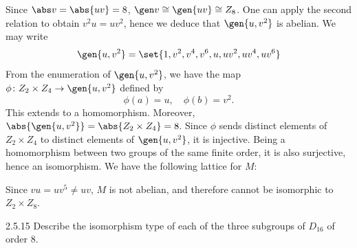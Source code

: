 \begin{sol}
    Since $\abs v = \abs{uv} = 8$, $\gen v \cong \gen{uv} \cong Z_8$.
	One can apply the second relation to obtain $v^2u = uv^2$, hence we deduce that $\gen{u, v^2}$ is abelian.
	We may write
    \[
    	\gen{u, v^2} = \set{1, v^2, v^4, v^6, u, uv^2, uv^4, uv^6}
    \]
    From the enumeration of $\gen{u, v^2}$, we have the map $\phi \colon Z_2 \times Z_4 \to \gen{u, v^2}$ defined by
    \[
    	\phi(a) = u, \quad \phi(b) = v^2.
    \]
    This extends to a homomorphism.
	Moreover, $\abs{\gen{u, v^2}} = \abs{Z_2 \times Z_4} = 8$.
	Since $\phi$ sends distinct elements of $Z_2 \times Z_4$ to distinct elements of $\gen{u, v^2}$, it is injective.
	Being a homomorphism between two groups of the same finite order, it is also surjective, hence an isomorphism.
	We have the following lattice for $M$:
    \begin{center}
    \end{center}
    Since $vu = uv^5 \neq uv$, $M$ is not abelian, and therefore cannot be isomorphic to $Z_2 \times Z_8$.
\end{sol}

\begin{exercise}{2.5.15}
    Describe the isomorphism type of each of the three subgroups of $D_{16}$ of order 8.
\end{exercise}

